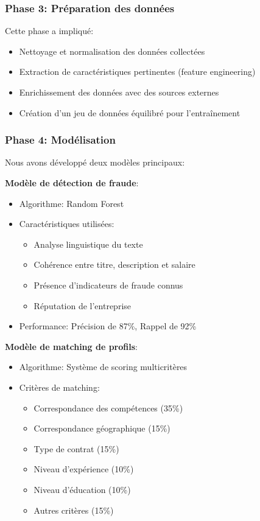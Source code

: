 \documentclass[10pt,a4paper,twocolumn]{article}
\begin{document}
\subsubsection{Phase 3: Préparation des données}
Cette phase a impliqué:
\begin{itemize}
    \item Nettoyage et normalisation des données collectées
    \item Extraction de caractéristiques pertinentes (feature engineering)
    \item Enrichissement des données avec des sources externes
    \item Création d'un jeu de données équilibré pour l'entraînement
\end{itemize}

\subsubsection{Phase 4: Modélisation}
Nous avons développé deux modèles principaux:

\textbf{Modèle de détection de fraude}:
\begin{itemize}
    \item Algorithme: Random Forest
    \item Caractéristiques utilisées:
    \begin{itemize}
        \item Analyse linguistique du texte
        \item Cohérence entre titre, description et salaire
        \item Présence d'indicateurs de fraude connus
        \item Réputation de l'entreprise
    \end{itemize}
    \item Performance: Précision de 87\%, Rappel de 92\%
\end{itemize}

\textbf{Modèle de matching de profils}:
\begin{itemize}
    \item Algorithme: Système de scoring multicritères
    \item Critères de matching:
    \begin{itemize}
        \item Correspondance des compétences (35\%)
        \item Correspondance géographique (15\%)
        \item Type de contrat (15\%)
        \item Niveau d'expérience (10\%)
        \item Niveau d'éducation (10\%)
        \item Autres critères (15\%)
    \end{itemize}
\end{itemize}
\end{document}
